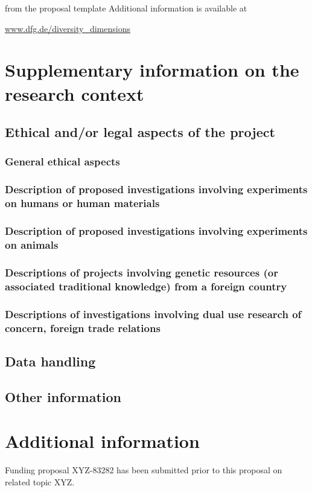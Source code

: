 \documentclass[    %
    gitinfo,       %
    noworkareas,   %
    RAM,           %
    general,       %
    \classoptions] %
    {dfgproposal}
\begin{document}
\begin{proposal}
\begin{todo}{from the proposal template}
	Additional information is available at
	
	\url{www.dfg.de/diversity_dimensions}
\end{todo}

\pagebreak
\setcounter{page}{1}

\section{Supplementary information on the research context}

\subsection{Ethical and/or legal aspects of the project}

\subsubsection{General ethical aspects}
\subsubsection{Description of proposed investigations involving experiments on humans or human materials}
\subsubsection{Description of proposed investigations involving experiments on animals}
\subsubsection{Descriptions of projects involving genetic resources (or associated traditional knowledge) from a foreign country}
\subsubsection{Descriptions of investigations involving dual use research of concern, foreign trade relations}

\subsection{Data handling}

\subsection{Other information}




\section{Additional information }

Funding proposal XYZ-83282 has been submitted prior to this proposal on related topic XYZ.
\fi %
\end{proposal}
\end{document}
